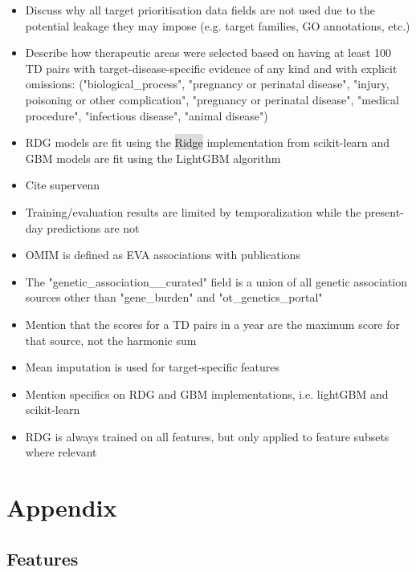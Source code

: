 \documentclass{article}
\begin{document}
\begin{itemize}
  \item Discuss why all target prioritisation data fields are not used due to the potential leakage they may impose (e.g. target families, GO annotations, etc.)
  \item Describe how therapeutic areas were selected based on having at least 100 TD pairs with target-disease-specific evidence of any kind and with explicit omissions: ("biological\_process", "pregnancy or perinatal disease", "injury, poisoning or other complication", "pregnancy or perinatal disease", "medical procedure", "infectious disease", "animal disease")
  \item RDG models are fit using the \colorbox{Gainsboro}{Ridge} implementation from scikit-learn and GBM models are fit using the LightGBM \cite{LightGBM} algorithm
  \item Cite supervenn
  \item Training/evaluation results are limited by temporalization while the present-day predictions are not
  \item OMIM is defined as EVA associations with publications
  \item The "genetic\_association\_\_curated" field is a union of all genetic association sources other than "gene\_burden" and "ot\_genetics\_portal"
  \item Mention that the scores for a TD pairs in a year are the maximum score for that source, not the harmonic sum
  \item Mean imputation is used for target-specific features
  \item Mention specifics on RDG and GBM implementations, i.e. lightGBM and scikit-learn
  \item RDG is always trained on all features, but only applied to feature subsets where relevant
\end{itemize} 

\section{Appendix}

\subsection{Features}


\end{document}
